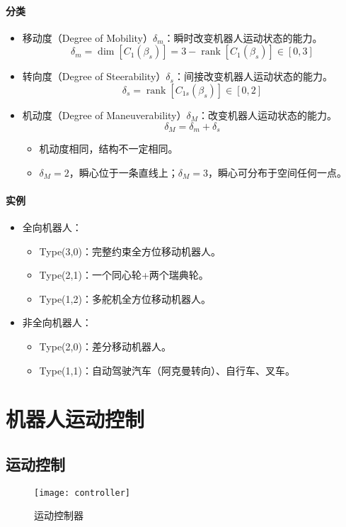 \documentclass[
12pt, %
a4paper, 
oneside, %
headinclude,footinclude, %
]{scrartcl}
\begin{document}
\paragraph{分类}
\begin{itemize}
\item 移动度（Degree of Mobility）$ \delta_m $：瞬时改变机器人运动状态的能力。
$$ \delta_m = \dim[C_1(\beta_s)] = 3 - \operatorname{rank}[C_1(\beta_s)] \in [0,3] $$
\item 转向度（Degree of Steerability）$ \delta_s $：间接改变机器人运动状态的能力。
$$ \delta_s = \operatorname{rank}[C_{1s}(\beta_s)] \in [0,2] $$
\item 机动度（Degree of Maneuverability）$ \delta_M $：改变机器人运动状态的能力。
$$ \delta_M = \delta_m + \delta_s $$
\begin{itemize}
\item 机动度相同，结构不一定相同。
\item $ \delta_M = 2 $，瞬心位于一条直线上；$ \delta_M = 3 $，瞬心可分布于空间任何一点。
\end{itemize}
\end{itemize}
\paragraph{实例}
\begin{itemize}
\item 全向机器人：
\begin{itemize}
\item Type(3,0)：完整约束全方位移动机器人。
\item Type(2,1)：一个同心轮+两个瑞典轮。
\item Type(1,2)：多舵机全方位移动机器人。
\end{itemize}
\item 非全向机器人：
\begin{itemize}
\item Type(2,0)：差分移动机器人。
\item Type(1,1)：自动驾驶汽车（阿克曼转向）、自行车、叉车。
\end{itemize}
\end{itemize}
\section{机器人运动控制}
\subsection[运动控制]{运动控制}\label{sec:motion_control}
\begin{figure}[H]
\centering 
\texttt{[image: controller]} 
\caption[运动控制器]{运动控制器}
\end{figure}
\end{document}
